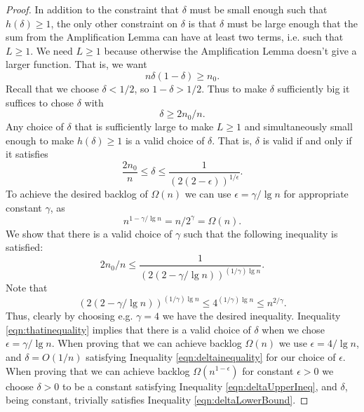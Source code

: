 \begin{proof}
In addition to the constraint that $\delta$ must be small enough such that
$h(\delta) \ge 1$, the only other constraint on $\delta$ is that $\delta$
must be large enough that the sum from the Amplification Lemma can have at least
two terms, i.e. such that $L \ge 1$. We need $L\ge 1$ because otherwise the
Amplification Lemma doesn't give a larger function.
That is, we want
$$n\delta(1-\delta) \ge n_0. $$
Recall that we choose $\delta < 1/2$, so $1-\delta > 1/2$. Thus to make
$\delta$ sufficiently big it suffices to chose $\delta$ with 
\begin{equation}
  \label{eqn:deltaLowerBound}
  \delta \ge 2n_0/n.
\end{equation}
Any choice of $\delta$ that is sufficiently large to make $L \ge 1$ and
simultaneously small enough to make $h(\delta) \ge 1$ is a valid choice of
$\delta$. That is, $\delta$ is valid if and only if it satisfies
\begin{equation}
  \label{eqn:deltainequality}
  \frac{2n_0}{n} \le \delta \le  \frac{1}{(2(2-\epsilon))^{1/\epsilon}}.
\end{equation}
To achieve the desired backlog of $\Omega(n)$ we can use $\epsilon =
\gamma/\lg n$ for appropriate constant $\gamma$, as $$n^{1-\gamma/\lg n} =
n/2^\gamma = \Omega(n).$$
We show that there is a valid choice of $\gamma$ such that the
following inequality is satisfied:
\begin{equation}
  \label{eqn:thatinequality}
 2n_0/n \le \frac{1}{(2(2-\gamma/\lg n))^{(1/\gamma)\lg n}}.
\end{equation}
Note that 
$$(2(2-\gamma/\lg n))^{(1/\gamma)\lg n} \le 4^{(1/\gamma)\lg n} \le n^{2/\gamma}.$$
Thus, clearly by choosing e.g. $\gamma = 4$ we have the desired inequality.
Inequality \ref{eqn:thatinequality} implies that there is a valid choice of
$\delta$ when we chose $\epsilon = \gamma / \lg n$. When proving that we can
achieve backlog $\Omega(n)$ we use $\epsilon = 4 / \lg n$, and $\delta =
O(1/n)$ satisfying Inequality \ref{eqn:deltainequality} for our choice
of $\epsilon$. When proving that we can achieve backlog
$\Omega(n^{1-\epsilon})$ for constant $\epsilon > 0$ we choose $\delta > 0$ to be
a constant satisfying Inequality \ref{eqn:deltaUpperIneq}, and $\delta$,
being constant, trivially satisfies Inequality \ref{eqn:deltaLowerBound}.
  
\end{proof}


